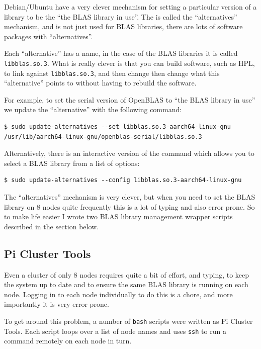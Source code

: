\documentclass{report}
\begin{document}
Debian/Ubuntu have a very clever mechanism for setting a particular version of a library to be the ``the BLAS library in use''. The is called the ``alternatives'' mechanism, and is not just used for BLAS libraries, there are lots of software packages with ``alternatives''.

Each ``alternative'' has a name, in the case of the BLAS libraries it is called \verb|libblas.so.3|. What is really clever is that you can build software, such as HPL, to link against \verb|libblas.so.3|, and then change then change what this ``alternative'' points to without having to rebuild the software.

For example, to set the serial version of OpenBLAS to ``the BLAS library in use'' we update the ``alternative'' with the following command:

\lstset{style=type}
\begin{lstlisting}
$ sudo update-alternatives --set libblas.so.3-aarch64-linux-gnu /usr/lib/aarch64-linux-gnu/openblas-serial/libblas.so.3
\end{lstlisting}

Alternatively, there is an interactive version of the command which allows you to select a BLAS library from a list of options:

\lstset{style=type}
\begin{lstlisting}
$ sudo update-alternatives --config libblas.so.3-aarch64-linux-gnu
\end{lstlisting}

The ``alternatives'' mechanism is very clever, but when you need to set the BLAS library on 8 nodes quite frequently this is a lot of typing and also error prone. So to make life easier I wrote two BLAS library management wrapper scripts described in the section below. 


%
%
\subsection{Pi Cluster Tools}

Even a cluster of only 8 nodes requires quite a bit of effort, and typing, to keep the system up to date and to ensure the same BLAS library is running on each node. Logging in to each node individually to do this is a chore, and more importantly it is very error prone.

To get around this problem, a number of \verb|bash| scripts were written as Pi Cluster Tools. Each script loops over a list of node names and uses \verb|ssh| to run a command remotely on each node in turn.
\end{document}
